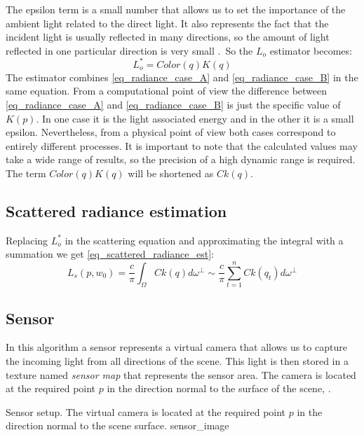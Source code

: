 \documentclass[10pt, conference]{IEEEtran}
\begin{document}
The epsilon term is a small number that allows us to set the importance of the ambient light related to the direct light. 
It also represents the fact that the incident light is usually reflected in many directions, so the amount of light reflected in one particular direction is very small \cite{brdf}.\
So the $L_o$ estimator becomes:
\[
	L^*_o = Color(q)K(q)
\]
The estimator combines \ref{eq_radiance_case_A} and \ref{eq_radiance_case_B} in the same equation. 
From a computational point of view the difference between \ref{eq_radiance_case_A} and \ref{eq_radiance_case_B} is just the specific value of $K(p)$. 
In one case it is the light associated energy and in the other it is a small epsilon. 
Nevertheless, from a physical point of view both cases correspond to entirely different processes. 
It is important to note that the calculated values may take a wide range of results, so the precision of a high dynamic range \cite{high_dynamic_range} is required. The term $Color(q)K(q)$ will be shortened as $Ck(q)$.



\subsection{Scattered radiance estimation}

Replacing $L^*_o$ in the scattering equation and approximating the integral with a summation we get \ref{eq_scattered_radiance_est}:
\begin{equation}
	\label{eq_scattered_radiance_est}
	L_s(p, w_0)=\frac{c}{\pi}\int_\Omega Ck(q)d\omega^\perp \sim \frac{c}{\pi}\sum_{t=1}^n{Ck(q_t)}d\omega^\perp
\end{equation}		

\subsection{Sensor}

In this algorithm a sensor represents a virtual camera that allows us to capture the incoming light from all directions of the scene. 
This light is then stored in a texture named \emph{sensor map} that represents the sensor area. 
The camera is located at the required point $p$ in the direction normal to the surface of the scene, .

\subimages
	{Sensor setup. The virtual camera is located at the required point $p$ in the direction normal to the scene surface.}
	{sensor_image}{
}
\end{document}
